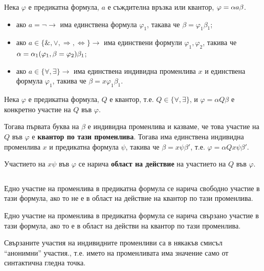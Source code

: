 \documentclass{article}
\begin{document}
\begin{mydef}
Нека $\varphi$ е предикатна формула, $a$ е съждителна връзка или квантор, $\\ \varphi = \alpha a \beta$.

\begin{itemize}
\item ако $a = \neg \longrightarrow$ има единствена формула $\varphi_1$, такава че $\beta = \varphi_1 \beta_1$;
\item ако $a \in \{\&, \lor, \Rightarrow, \Leftrightarrow\} \longrightarrow$ има единствени формули $\varphi_1, \varphi_2$, такива че $\alpha = \alpha_1(\varphi_1, \\ \beta = \varphi_2)\beta_1$;
\item ако $a \in \{\forall, \exists\} \longrightarrow$ има единствена индивидна променлива $x$ и единствена формула $\varphi_1$, такива че $\beta = x\varphi_1\beta_1$.
\end{itemize}
\end{mydef}

\begin{mydef}
Нека $\varphi$ е предикатна формула, $Q$ е квантор, т.е. $Q \in \{\forall, \exists\}$, и $\varphi = \alpha Q \beta$ е конкретно участие на $Q$ във $\varphi$.

Тогава първата буква на $\beta$ е индивидна променлива и казваме, че това участие на $Q$ във $\varphi$ е \textbf{квантор по тази променлива}. Тогава има единствена индивидна променлива $x$ и предикатна формула $\psi$, такива че $\beta = x\psi\beta'$, т.е. $\varphi = \alpha Q x\psi\beta'$.

Участието на $x\psi$ във $\varphi$ се нарича \textbf{област на действие} на участието на $Q$ във $\varphi$.
\end{mydef}

\begin{mydef}
$\ $

Едно участие на променлива в предикатна формула се нарича свободно участие в тази формула, ако то не е в област на действие на квантор по тази променлива.

Едно участие на променлива в предикатна формула се нарича свързано участие в тази формула, ако то е в област на действи на квантор по тази променлива.

\begin{remark}
Свързаните участия на индивидните променливи са в някакъв смисъл ``анонимни'' участия., т.е. името на променливата има значение само от синтактична гледна точка.
\end{remark}
\end{mydef}
\end{document}
